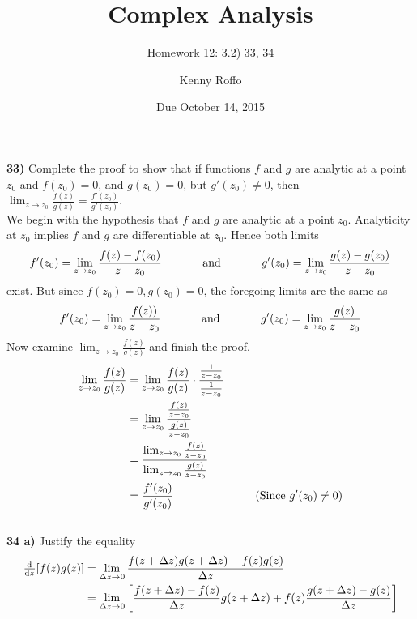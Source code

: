 \documentclass{scrartcl}
\title{Complex Analysis}
\subtitle{Homework 12: 3.2) 33, 34}
\author{Kenny Roffo}
\date{Due October 14, 2015}
\begin{document}
\maketitle

\textbf{33)} Complete the proof to show that if functions $f$ and $g$ are analytic at a point $z_0$ and $f(z_0)=0$, and $g(z_0)=0$, but $g'(z_0)\ne0$, then $\lim_{z\rightarrow z_0}\frac{f(z)}{g(z)} = \frac{f'(z_0)}{g'(z_0)}$.\\

We begin with the hypothesis that $f$ and $g$ are analytic at a point $z_0$. Analyticity at $z_0$ implies $f$ and $g$ are differentiable at $z_0$. Hence both limits
$$f'(z_0)=\lim_{z\rightarrow z_0}\frac{f(z)-f(z_0)}{z-z_0} \text{\hspace{0.5in}and\hspace{0.5in}} g'(z_0)=\lim_{z\rightarrow z_0}\frac{g(z)-g(z_0)}{z-z_0}$$
exist. But since $f(z_0)=0, g(z_0)=0$, the foregoing limits are the same as
$$f'(z_0)=\lim_{z\rightarrow z_0}\frac{f(z))}{z-z_0} \text{\hspace{0.5in}and\hspace{0.5in}} g'(z_0)=\lim_{z\rightarrow z_0}\frac{g(z)}{z-z_0}$$
Now examine $\lim_{z\rightarrow z_0}\frac{f(z)}{g(z)}$ and finish the proof.\\

\begin{align*}
  \lim_{z\rightarrow z_0}\frac{f(z)}{g(z)} &= \lim_{z\rightarrow z_0}\frac{f(z)}{g(z)}\cdot\frac{\frac{1}{z-z_0}}{\frac{1}{z-z_0}}\\
  &= \lim_{z\rightarrow z_0}\frac{\frac{f(z)}{z-z_0}}{\frac{g(z)}{z-z_0}}\\
  &= \frac{\lim_{z\rightarrow z_0}\frac{f(z)}{z-z_0}}{\lim_{z\rightarrow z_0}\frac{g(z)}{z-z_0}}\\
  &= \frac{f'(z_0)}{g'(z_0)} \text{\hspace{1in}(Since $g'(z_0)\ne0$)}
\end{align*}\\

\textbf{34 a)} Justify the equality 
\begin{align*}
  \od{}{z}[f(z)g(z)] &= \lim_{\Delta z\rightarrow0}\frac{f(z+\Delta z)g(z+\Delta z) - f(z)g(z)}{\Delta z}\\
  &= \lim_{\Delta z\rightarrow0}\left[\frac{f(z+\Delta z) - f(z)}{\Delta z}g(z+\Delta z) + f(z)\frac{g(z+\Delta z)-g(z)}{\Delta z}\right]
\end{align*}\\
\end{document}
